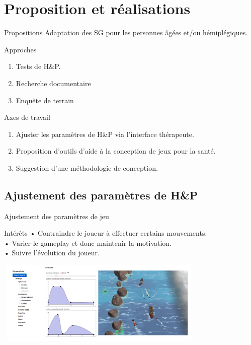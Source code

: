 \documentclass{beamer}
\begin{document}
	\section{Proposition et réalisations}	
		\begin{frame}{Propositions}
		Adaptation des SG pour les personnes âgées et/ou hémiplégiques.
			\begin{block}{Approches}
				\begin{enumerate}
					\item Tests de H\&P.
					\item Recherche documentaire
					\item Enquête de terrain
				\end{enumerate}
			\end{block}\pause
			\begin{exampleblock}{Axes de travail}			
				\begin{enumerate}
					\item Ajuster les paramètres de H\&P via l'interface thérapeute.
					\item Proposition d'outils d'aide à la conception de jeux pour la santé.
					\item Suggestion d'une méthodologie de conception.
				\end{enumerate}
			\end{exampleblock}
		\end{frame}		
				
		\subsection{Ajustement des paramètres de H\&P}	
		\begin{frame}{Ajustement des paramètres de jeu}
				\begin{block}{Intérêts}
					• Contraindre le joueur à effectuer certains mouvements.\\
					• Varier le gameplay et donc maintenir la motivation.\\
					• Suivre l'évolution du joueur.
				\end{block}
			\includegraphics[width=10cm, height=4cm]{../images/comparatif_interface_rochers.png}
		\end{frame}			
			
\end{document}

